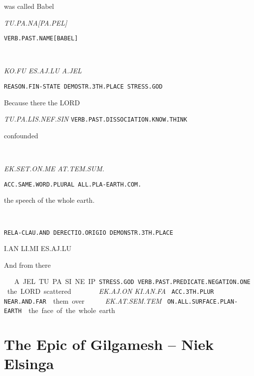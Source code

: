 {\drie
 
was called Babel 

{\it TU.PA.NA[PA.PEL] }

{\tt VERB.PAST.NAME[BABEL] }

\tu\pa\na\cartouche{\pa\pel}

\drie


\ko\fu~\es\aj\lu~\Atlana\jel

{\it KO.FU			ES.AJ.LU			A.JEL }

{\tt REASON.FIN-STATE          DEMOSTR.3TH.PLACE		STRESS.GOD }

Because 		there 				the LORD  
\drie

\tu\pa\lis\nef\Atlansin

{\it TU.PA.LIS.NEF.SIN}                                              			 
{\tt VERB.PAST.DISSOCIATION.KNOW.THINK	 }

confounded 
\drie

 

\at\tem\Atlansum~\ek\set\on\me\period

{\it EK.SET.ON.ME      AT.TEM.SUM.			}


{\tt ACC.SAME.WORD.PLURAL 	ALL.PLA-EARTH.COM. }

the speech			 of the whole earth.

\drie

\Atlani\an~\li\mi~\es\aj\lu

{\tt RELA-CLAU.AND	DERECTIO.ORIGIO      DEMONSTR.3TH.PLACE }

I.AN			LI.MI			ES.AJ.LU			 

And 			from 			there 		
\drie

\Atlana\jel~\tu\pa\si\Atlanne\ip

A.JEL		TU.PA.SI.NE.IP    

{\tt STRESS.GOD	VERB.PAST.PREDICATE.NEGATION.ONE }

the LORD	scattered 
\drie

 
\ek\aj\on~\ki\an\fa

{\it EK.AJ.ON	KI.AN.FA               }

{\tt ACC.3TH.PLUR	NEAR.AND.FAR	 }

them 		over 		 
\drie
  
\ek\at\sem\tem

{\it EK.AT.SEM.TEM }

{\tt ON.ALL.SURFACE.PLAN-EARTH }

the face of the whole earth. 
\drie
\vfill

\pagebreak
\section{The Epic of Gilgamesh -- {\small Niek Elsinga}}


}
